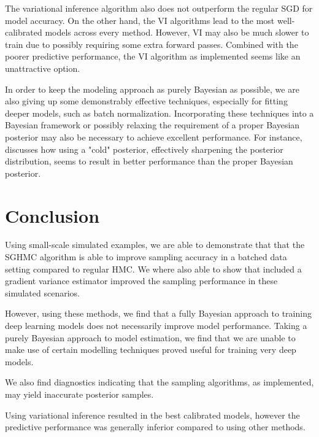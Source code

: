 The variational inference algorithm also does not outperform the regular SGD for model accuracy. 
On the other hand, the VI algorithms lead to the most well-calibrated models across every method. 
However, VI may also be much slower to train due to possibly requiring some extra forward passes.
Combined with the poorer predictive performance, the VI algorithm as implemented seems like an unattractive option.

In order to keep the modeling approach as purely Bayesian as possible, we are also giving up some demonstrably effective techniques, especially for fitting deeper models, such as batch normalization.
Incorporating these techniques into a Bayesian framework or possibly relaxing the requirement of a proper Bayesian posterior may also be necessary to achieve excellent performance.
For instance, \autocite{wenzel_how_2020} discusses how using a "cold" posterior, effectively sharpening the posterior distribution, seems to result in better performance than the proper Bayesian posterior.


\chapter{Conclusion}

Using small-scale simulated examples, we are able to demonstrate that that the SGHMC algorithm is able to improve sampling accuracy in a batched data setting compared to regular HMC.
We where also able to show that included a gradient variance estimator improved the sampling performance in these simulated scenarios.

However, using these methods, we find that a fully Bayesian approach to training deep learning models does not necessarily improve model performance.
Taking a purely Bayesian approach to model estimation, we find that we are unable to make use of certain modelling techniques proved useful for training very deep models. 

We also find diagnostics indicating that the sampling algorithms, as implemented, may yield inaccurate posterior samples.

Using variational inference resulted in the best calibrated models, however the predictive performance was generally inferior compared to using other methods.







